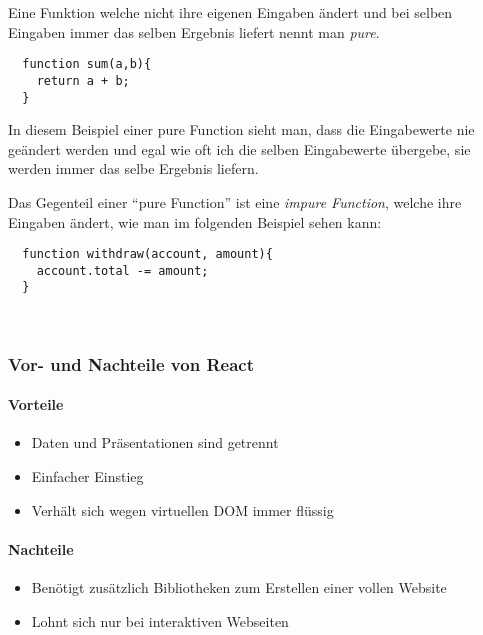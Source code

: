  Eine Funktion welche nicht ihre eigenen Eingaben ändert und bei selben Eingaben immer das selben 
 Ergebnis liefert nennt man \textit{pure}.
\begin{lstlisting}
  function sum(a,b){
    return a + b;
  }
\end{lstlisting}
In diesem Beispiel einer pure Function sieht man, dass die Eingabewerte nie geändert werden und egal 
wie oft ich die selben Eingabewerte übergebe, sie werden immer das selbe Ergebnis liefern.


Das Gegenteil einer ``pure Function'' ist eine \textit{impure Function}, welche ihre Eingaben ändert, 
wie man im folgenden Beispiel sehen kann:
\begin{lstlisting}
  function withdraw(account, amount){
    account.total -= amount;
  }
\end{lstlisting}
~\cite{Props}
\subsubsection{Vor- und Nachteile von React}
\paragraph{Vorteile}
\begin{itemize}
	\item Daten und Präsentationen sind getrennt
	\item Einfacher Einstieg
	\item Verhält sich wegen virtuellen DOM immer flüssig
\end{itemize}
\paragraph{Nachteile}
\begin{itemize}
	\item Benötigt zusätzlich Bibliotheken zum Erstellen einer vollen Website
	\item Lohnt sich nur bei interaktiven Webseiten
\end{itemize}
~\cite{ReactVor-undNachteile}
\pagebreak